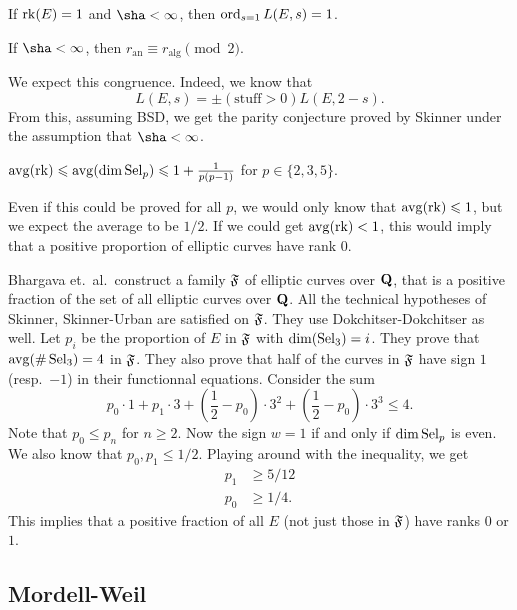 \begin{theorem}[Skinner]
If $\operatorname{rk}(E)=1$ and $\sha<\infty$, then $\operatorname{ord}_{s=1} L(E,s)=1$. 
\end{theorem}

\begin{theorem}
If $\sha<\infty$, then $r_\mathrm{an}\equiv r_\mathrm{alg}\pmod 2$. 
\end{theorem}

We expect this congruence. Indeed, we know that 
\[
  L(E,s) = \pm(\text{stuff}>0)L(E,2-s).
\]
From this, assuming BSD, we get the parity conjecture proved by Skinner 
under the assumption that $\sha<\infty$. 

\begin{theorem}
$\operatorname{avg}(\operatorname{rk}) \leqslant \operatorname{avg}(\dim \operatorname{Sel}_p)\leqslant 1+\frac{1}{p(p-1)}$ 
for $p\in \{2,3,5\}$. 
\end{theorem}

Even if this could be proved for all $p$, we would only know that 
$\operatorname{avg}(\operatorname{rk}) \leqslant 1$, but we expect the average to be $1/2$. If we 
could get $\operatorname{avg}(\operatorname{rk})<1$, this would imply that a positive proportion of 
elliptic curves have rank $0$. 

Bhargava et.~al.~construct a family $\mathfrak{F}$ of elliptic curves over $\mathbf{Q}$, 
that is a positive fraction of the set of all elliptic curves over $\mathbf{Q}$. All 
the technical hypotheses of Skinner, Skinner-Urban are satisfied on $\mathfrak{F}$. They 
use Dokchitser-Dokchitser as well. Let $p_i$ be the proportion of $E$ in $\mathfrak{F}$ 
with $\dim(\operatorname{Sel}_3)=i$. They prove that $\operatorname{avg}(\#\operatorname{Sel}_3)=4$ in $\mathfrak{F}$. 
They also prove that half of the curves in $\mathfrak{F}$ have sign $1$ (resp.~$-1$) in 
their functionnal equations. Consider the sum 
\[
  p_0\cdot 1 + p_1\cdot 3 + \left(\frac 1 2-p_0\right)\cdot 3^2 + \left(\frac 1 2-p_0\right)\cdot 3^3 \leqslant 4.
\]
Note that $p_0\leqslant p_n$ for $n\geqslant 2$. Now the sign $w=1$ if 
and only if $\dim\operatorname{Sel}_p$ is even. We also know that $p_0,p_1\leqslant 1/2$. 
Playing around with the inequality, we get 
\begin{align*}
  p_1 &\geqslant 5/12 \\
  p_0 &\geqslant 1/4 .
\end{align*}
This implies that a positive fraction of all $E$ (not just those in $\mathfrak{F}$) have 
ranks $0$ or $1$. 





\subsection{Mordell-Weil}

